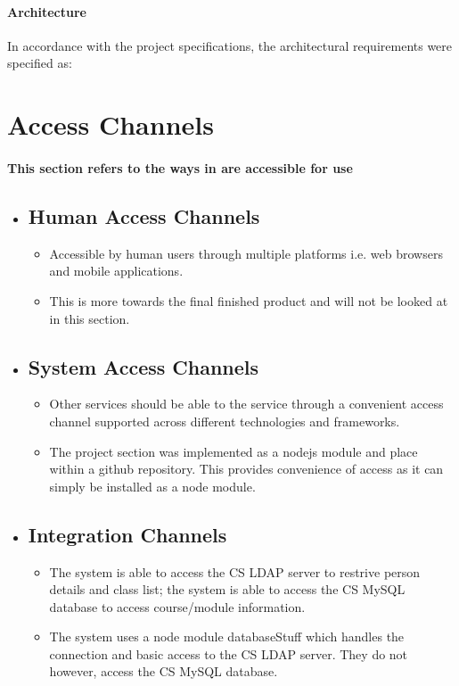 \paragraph{Architecture}
In accordance with the project specifications, the architectural requirements were specified as:
    \section{Access Channels}
    \paragraph{This section refers to the ways in are accessible for use}
        \begin{itemize}
            \item \subsection{Human Access Channels}
                \begin{itemize}
                    \item Accessible by human users through multiple platforms i.e. web browsers and mobile applications.
                    \item This is more towards the final finished product and will not be looked at in this section.
                \end{itemize}
                
            \item \subsection{System Access Channels}
                \begin{itemize}
                    \item Other services should be able to the service through a convenient access channel  supported across different technologies and frameworks.
                    \item The project section was implemented as a nodejs module and place within a github repository. This provides convenience of access as it can simply be installed as a node module.
                \end{itemize}
                
            \item \subsection{Integration Channels}
                \begin{itemize}
                    \item The system is able to access the CS LDAP server to restrive person details and class list; the system is able to access the CS MySQL database to access course/module information.
                    \item The system uses a node module databaseStuff which handles the connection and basic access to the CS LDAP server. They do not however, access the CS MySQL database.
                \end{itemize}
                

\end{itemize}
